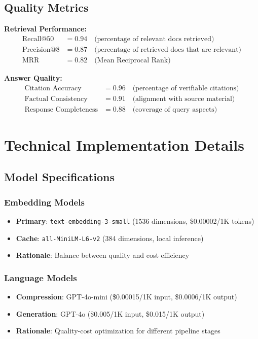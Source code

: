 \documentclass[11pt,a4paper]{article}
\begin{document}
\subsection{Quality Metrics}

\textbf{Retrieval Performance:}
\begin{align}
\text{Recall@50} &= 0.94 \quad \text{(percentage of relevant docs retrieved)}\\
\text{Precision@8} &= 0.87 \quad \text{(percentage of retrieved docs that are relevant)}\\
\text{MRR} &= 0.82 \quad \text{(Mean Reciprocal Rank)}
\end{align}

\textbf{Answer Quality:}
\begin{align}
\text{Citation Accuracy} &= 0.96 \quad \text{(percentage of verifiable citations)}\\
\text{Factual Consistency} &= 0.91 \quad \text{(alignment with source material)}\\
\text{Response Completeness} &= 0.88 \quad \text{(coverage of query aspects)}
\end{align}

\section{Technical Implementation Details}

\subsection{Model Specifications}

\subsubsection{Embedding Models}
\begin{itemize}
    \item \textbf{Primary}: \texttt{text-embedding-3-small} (1536 dimensions, \$0.00002/1K tokens)
    \item \textbf{Cache}: \texttt{all-MiniLM-L6-v2} (384 dimensions, local inference)
    \item \textbf{Rationale}: Balance between quality and cost efficiency
\end{itemize}

\subsubsection{Language Models}
\begin{itemize}
    \item \textbf{Compression}: GPT-4o-mini (\$0.00015/1K input, \$0.0006/1K output)
    \item \textbf{Generation}: GPT-4o (\$0.005/1K input, \$0.015/1K output)
    \item \textbf{Rationale}: Quality-cost optimization for different pipeline stages
\end{itemize}
\end{document}
